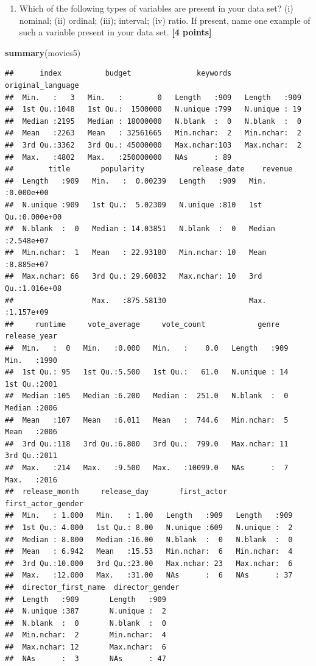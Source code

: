 \documentclass[
]{article}
\newenvironment{Shaded}{\begin{snugshade}}{\end{snugshade}}
\newcommand{\FunctionTok}[1]{\textcolor[rgb]{0.13,0.29,0.53}{\textbf{#1}}}
\newcommand{\NormalTok}[1]{#1}
\providecommand{\tightlist}{%
  \setlength{\itemsep}{0pt}\setlength{\parskip}{0pt}}
\begin{document}
\begin{enumerate}
\def\labelenumi{\arabic{enumi}.}
\setcounter{enumi}{1}
\tightlist
\item
  Which of the following types of variables are present in your data
  set? (i) nominal; (ii) ordinal; (iii); interval; (iv) ratio. If
  present, name one example of such a variable present in your data set.
  \textbf{[4 points]}
\end{enumerate}

\begin{Shaded}
\begin{Highlighting}[]
\FunctionTok{summary}\NormalTok{(movies5)}
\end{Highlighting}
\end{Shaded}

\begin{verbatim}
##      index          budget               keywords   original_language
##  Min.   :   3   Min.   :        0   Length   :909   Length   :909    
##  1st Qu.:1048   1st Qu.:  1500000   N.unique :799   N.unique : 19    
##  Median :2195   Median : 18000000   N.blank  :  0   N.blank  :  0    
##  Mean   :2263   Mean   : 32561665   Min.nchar:  2   Min.nchar:  2    
##  3rd Qu.:3362   3rd Qu.: 45000000   Max.nchar:103   Max.nchar:  2    
##  Max.   :4802   Max.   :250000000   NAs      : 89                    
##        title       popularity           release_date    revenue         
##  Length   :909   Min.   :  0.00239   Length   :909   Min.   :0.000e+00  
##  N.unique :909   1st Qu.:  5.02309   N.unique :810   1st Qu.:0.000e+00  
##  N.blank  :  0   Median : 14.03851   N.blank  :  0   Median :2.548e+07  
##  Min.nchar:  1   Mean   : 22.93180   Min.nchar: 10   Mean   :8.885e+07  
##  Max.nchar: 66   3rd Qu.: 29.60832   Max.nchar: 10   3rd Qu.:1.016e+08  
##                  Max.   :875.58130                   Max.   :1.157e+09  
##     runtime     vote_average     vote_count            genre      release_year 
##  Min.   :  0   Min.   :0.000   Min.   :    0.0   Length   :909   Min.   :1990  
##  1st Qu.: 95   1st Qu.:5.500   1st Qu.:   61.0   N.unique : 14   1st Qu.:2001  
##  Median :105   Median :6.200   Median :  251.0   N.blank  :  0   Median :2006  
##  Mean   :107   Mean   :6.011   Mean   :  744.6   Min.nchar:  5   Mean   :2006  
##  3rd Qu.:118   3rd Qu.:6.800   3rd Qu.:  799.0   Max.nchar: 11   3rd Qu.:2011  
##  Max.   :214   Max.   :9.500   Max.   :10099.0   NAs      :  7   Max.   :2016  
##  release_month     release_day       first_actor  first_actor_gender
##  Min.   : 1.000   Min.   : 1.00   Length   :909   Length   :909     
##  1st Qu.: 4.000   1st Qu.: 8.00   N.unique :609   N.unique :  2     
##  Median : 8.000   Median :16.00   N.blank  :  0   N.blank  :  0     
##  Mean   : 6.942   Mean   :15.53   Min.nchar:  6   Min.nchar:  4     
##  3rd Qu.:10.000   3rd Qu.:23.00   Max.nchar: 23   Max.nchar:  6     
##  Max.   :12.000   Max.   :31.00   NAs      :  6   NAs      : 37     
##  director_first_name  director_gender
##  Length   :909       Length   :909   
##  N.unique :387       N.unique :  2   
##  N.blank  :  0       N.blank  :  0   
##  Min.nchar:  2       Min.nchar:  4   
##  Max.nchar: 12       Max.nchar:  6   
##  NAs      :  3       NAs      : 47
\end{verbatim}
\end{document}
